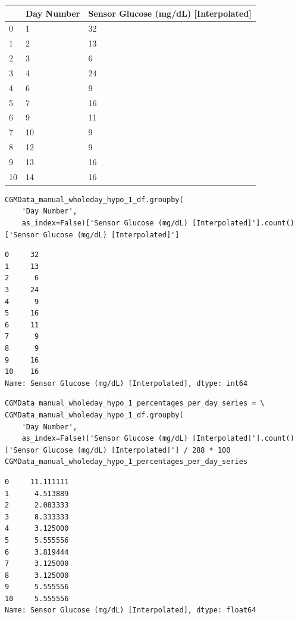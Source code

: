 \bigskip\noindent
\begin{tabular}{p{}p{}p{}}
\toprule
 & Day Number & Sensor Glucose (mg/dL) [Interpolated] \\
\hline
0 & 1 & 32 \\
\hline
1 & 2 & 13 \\
\hline
2 & 3 & 6 \\
\hline
3 & 4 & 24 \\
\hline
4 & 6 & 9 \\
\hline
5 & 7 & 16 \\
\hline
6 & 9 & 11 \\
\hline
7 & 10 & 9 \\
\hline
8 & 12 & 9 \\
\hline
9 & 13 & 16 \\
\hline
10 & 14 & 16 \\
\hline
\bottomrule
\end{tabular}

\bigskip

\begin{verbatim}
CGMData_manual_wholeday_hypo_1_df.groupby(
    'Day Number', 
    as_index=False)['Sensor Glucose (mg/dL) [Interpolated]'].count()['Sensor Glucose (mg/dL) [Interpolated]']
\end{verbatim}

\begin{verbatim}
0     32
1     13
2      6
3     24
4      9
5     16
6     11
7      9
8      9
9     16
10    16
Name: Sensor Glucose (mg/dL) [Interpolated], dtype: int64
\end{verbatim}

\begin{verbatim}
CGMData_manual_wholeday_hypo_1_percentages_per_day_series = \
CGMData_manual_wholeday_hypo_1_df.groupby(
    'Day Number', 
    as_index=False)['Sensor Glucose (mg/dL) [Interpolated]'].count()['Sensor Glucose (mg/dL) [Interpolated]'] / 288 * 100
CGMData_manual_wholeday_hypo_1_percentages_per_day_series
\end{verbatim}

\begin{verbatim}
0     11.111111
1      4.513889
2      2.083333
3      8.333333
4      3.125000
5      5.555556
6      3.819444
7      3.125000
8      3.125000
9      5.555556
10     5.555556
Name: Sensor Glucose (mg/dL) [Interpolated], dtype: float64
\end{verbatim}

